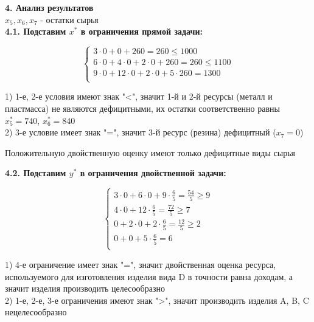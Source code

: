 {\bf4. Анализ результатов}\\
$x_5, x_6, x_7$ - остатки сырья\\
{\bf4.1. Подставим $x^{*}$ в ограничения прямой задачи:}

\begin{equation*}
    \begin{cases}
        3 \cdot 0 + 0 + 260 = 260 \le 1000 \\
        6 \cdot 0 + 4 \cdot 0 + 2 \cdot 0 + 260 = 260 \le 1100 \\
        9 \cdot 0 + 12 \cdot 0 + 2 \cdot 0 + 5 \cdot 260 = 1300 \\
    \end{cases}
\end{equation*}

\begin{flushleft}
    1) 1-е, 2-е условия имеют знак "<", значит 1-й и 2-й ресурсы (металл и пластмасса) не являются дефицитными, их остатки соответственно равны $x^{*}_5 = 740$, $x^{*}_6 = 840$\\
    2) 3-е условие имеет знак "=", значит 3-й ресурс (резина) дефицитный ($x_7 = 0$)
\end{flushleft}
\begin{flushleft}
    Положительную двойственную оценку имеют только дефицитные виды сырья
\end{flushleft}

{\bf4.2. Подставим $y^{*}$ в ограничения двойственной задачи:}

\begin{equation*}
    \begin{cases}
        3 \cdot 0 + 6 \cdot 0 + 9 \cdot \frac{6}{5} = \frac{54}{5} \ge 9 \\
        4 \cdot 0 + 12 \cdot \frac{6}{5} = \frac{72}{5} \ge 7 \\
        0 + 2 \cdot 0 + 2 \cdot \frac{6}{5} = \frac{12}{5} \ge 2 \\
        0 + 0 + 5 \cdot \frac{6}{5} = 6 \\
    \end{cases}
\end{equation*}

\begin{flushleft}
    1) 4-е ограничение имеет знак "=", значит двойственная оценка ресурса, используемого для изготовления изделия вида D в точности равна доходам, а значит изделия производить целесообразно\\
    2) 1-е, 2-е, 3-е ограничения имеют знак ">", значит производить изделия A, B, C нецелесообразно
\end{flushleft}

